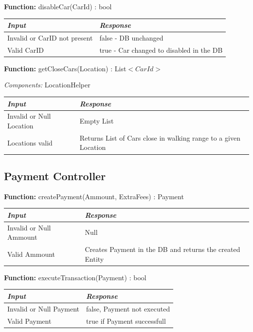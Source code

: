 \documentclass[a4paper]{article}
\begin{document}
\textbf{Function:} disableCar(CarId) : bool
\begin{center}
\begin{tabular}{ | L{6cm} | L{6cm} | }
\hline
	\textit{Input}& \textit{Response}\\ \hline
	Invalid or CarID not present & false - DB unchanged\\ \hline
	Valid CarID & true - Car changed to disabled in the DB\\ \hline
\end{tabular}
\end{center}
\textbf{Function:} getCloseCars(Location) : List\(<CarId>\) \par
\textit{Components:} LocationHelper
\begin{center}
\begin{tabular}{ | L{6cm} | L{6cm} | }
\hline
	\textit{Input}& \textit{Response}\\ \hline
	Invalid or Null Location & Empty List \\ \hline
	Locations valid & Returns List of Cars close in walking range to a given Location \\ \hline
\end{tabular}
\end{center}
\newpage

\subsection{Payment Controller}
\textbf{Function:} createPayment(Ammount, ExtraFees) : Payment \par
\begin{center}
\begin{tabular}{ | L{6cm} | L{6cm} | }
\hline
	\textit{Input}& \textit{Response}\\ \hline
	Invalid or Null Ammount & Null \\ \hline
	Valid Ammount & Creates Payment in the DB and returns the created Entity \\ \hline
\end{tabular}
\end{center}
\textbf{Function:} executeTransaction(Payment) : bool \par
\begin{center}
\begin{tabular}{ | L{6cm} | L{6cm} | }
\hline
	\textit{Input}& \textit{Response}\\ \hline
	Invalid or Null Payment & false, Payment not executed \\ \hline
	Valid Payment & true if Payment successfull \\ \hline
\end{tabular}
\end{center}
\end{document}
